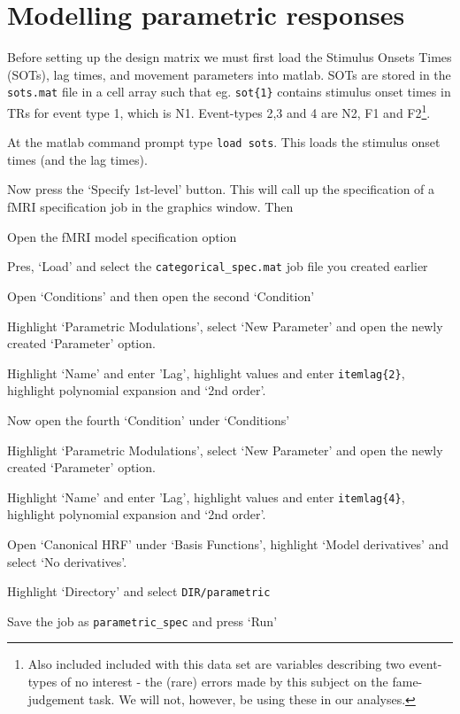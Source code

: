 \section{Modelling parametric responses}

Before setting up the design matrix we must first load the Stimulus Onsets Times (SOTs), lag times, and movement parameters into matlab. SOTs are stored in the \verb!sots.mat! file in a cell array such that eg. \verb!sot{1}! contains stimulus onset times in TRs for event type 1, which is N1. Event-types 2,3 and 4 are N2, F1 and F2\footnote{Also included included with this data set are variables describing two event-types of no interest - the (rare) errors made by this subject on the fame-judgement task. We will not, however, be using these in our analyses.}.

\bi
\item{At the matlab command prompt type \verb!load sots!. This loads the stimulus onset times (and the lag times).}
\ei

Now press the `Specify 1st-level' button. This will call up the specification of a fMRI specification job in the graphics window. Then

\bi
\item{Open the fMRI model specification option}
\item{Pres, `Load' and select the \verb!categorical_spec.mat! job file you created earlier}
\item{Open `Conditions' and then open the second `Condition'}
\item{Highlight `Parametric Modulations', select `New Parameter' and open the newly created `Parameter' option.}
\item{Highlight `Name' and enter 'Lag', highlight values and enter \verb!itemlag{2}!, highlight polynomial expansion and `2nd order'.}
\item{Now open the fourth `Condition' under `Conditions'}
\item{Highlight `Parametric Modulations', select `New Parameter' and open the newly created `Parameter' option.}
\item{Highlight `Name' and enter 'Lag', highlight values and enter \verb!itemlag{4}!, highlight polynomial expansion and `2nd order'.}
\item{Open `Canonical HRF' under `Basis Functions', highlight `Model derivatives' and select `No derivatives'.}
\item{Highlight `Directory' and select \verb!DIR/parametric!}
\item{Save the job as \verb!parametric_spec! and press `Run'}
\ei

